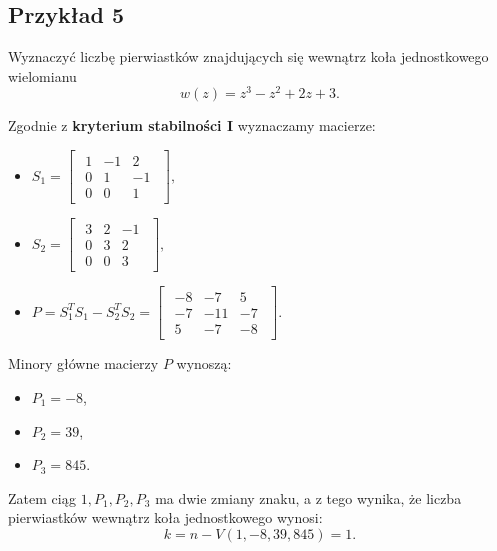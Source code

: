 \documentclass{article}
\begin{document}
    \subsection{Przykład 5}
    Wyznaczyć liczbę pierwiastków znajdujących się wewnątrz koła jednostkowego wielomianu
    $$
        w(z) = z^{3} - z^{2} + 2z + 3.
    $$

    Zgodnie z \textbf{kryterium stabilności I} wyznaczamy macierze:
    \begin{itemize}
        \item
        $
        S_{1}
        =
        \begin{bmatrix}
        \begin{array}{crr}
            1   &   -1  &   2\\
            0   &   1   &   -1\\
            0   &   0   &   1
        \end{array}
        \end{bmatrix},
        $

        \item
        $
        S_{2}
        =
        \begin{bmatrix}
        \begin{array}{ccr}
            3   &   2   &   -1\\
            0   &   3   &   2\\
            0   &   0   &   3
        \end{array}
        \end{bmatrix},
        $

        \item 
        $
        P = S_{1}^{T}S_{1} - S_{2}^{T}S_{2}
        =
        \begin{bmatrix}
        \begin{array}{rrr}
            -8  &   -7   &   5\\
            -7  &   -11  &   -7\\
            5   &   -7   &   -8
        \end{array}
        \end{bmatrix}.
        $
    \end{itemize}
    Minory główne macierzy $P$ wynoszą:
    \begin{itemize}
        \item $P_{1} = -8$,
        \item $P_{2} = 39$,
        \item $P_{3} = 845$.
    \end{itemize}
    Zatem ciąg $1, P_{1}, P_{2}, P_{3}$ ma dwie zmiany znaku, a z tego wynika, że liczba pierwiastków wewnątrz koła jednostkowego wynosi:
    $$
        k = n - V(1, -8, 39, 845) = 1.
    $$
\end{document}
